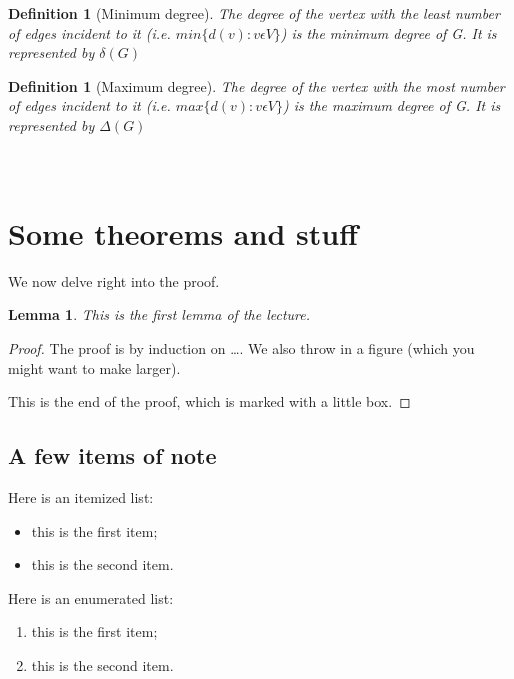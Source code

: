 \documentclass{article}
\newcounter{lecnum}
\newcommand{\fig}[4]{
			\begin{center}
	                \texttt{[image: \#3]} \\
			Figure \thelecnum.#1:~#2
			\end{center}
	}
\newtheorem{lemma}[theorem]{Lemma}
\newtheorem{definition}[theorem]{Definition}
\begin{document}
\begin{definition}[Minimum degree]
\quad The degree of the vertex with the least number of edges incident to it 
(i.e. $min\{d(v) : v \epsilon V\}$) is the minimum degree of G.
It is represented by $\delta(G)$\\
\end{definition}

\begin{definition}[Maximum degree]
\quad The degree of the vertex with the most number of edges incident to it 
(i.e. $max\{d(v) : v \epsilon V\}$) is the maximum degree of G.
It is represented by $\Delta(G)$\\~\\~\\
\end{definition}

\section{Some theorems and stuff} %

We now delve right into the proof.

\begin{lemma}
This is the first lemma of the lecture.
\end{lemma}

\begin{proof}
The proof is by induction on \ldots.
We also throw in a figure (which you might want to make larger).


This is the end of the proof, which is marked with a little box.
\end{proof}

\subsection{A few items of note}

Here is an itemized list:
\begin{itemize}
\item this is the first item;
\item this is the second item.
\end{itemize}
Here is an enumerated list:
\begin{enumerate}
\item this is the first item;
\item this is the second item.
\end{enumerate}
\end{document}
